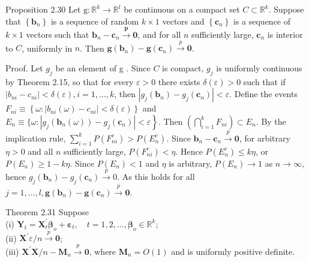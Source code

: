 \documentclass[10pt]{article}
\begin{document}
Proposition 2.30 Let $\mathrm{g}: \mathbb{R}^{k} \rightarrow \mathbb{R}^{l}$ be continuous on a compact set $C \subset \mathbb{R}^{k}$. Suppose that $\left\{\mathbf{b}_{n}\right\}$ is a sequence of random $k \times 1$ vectors and $\left\{\mathbf{c}_{n}\right\}$ is a sequence of $k \times 1$ vectors such that $\mathbf{b}_{n}-\mathbf{c}_{n} \xrightarrow{\boldsymbol{p}} \mathbf{0}$, and for all $n$ sufficiently large, $\mathbf{c}_{n}$ is interior to $C$, uniformly in $n$. Then $\mathbf{g}\left(\mathbf{b}_{n}\right)-\mathbf{g}\left(\mathbf{c}_{n}\right) \xrightarrow{p} \mathbf{0}$.

Proof. Let $g_{j}$ be an element of g . Since $C$ is compact, $g_{j}$ is uniformly continuous by Theorem 2.15, so that for every $\varepsilon>0$ there exists $\delta(\varepsilon)>0$ such that if $\left|b_{n i}-c_{n i}\right|<\delta(\varepsilon), i=1, \ldots, k$, then $\left|g_{j}\left(\mathbf{b}_{n}\right)-g_{j}\left(\mathbf{c}_{n}\right)\right|< \varepsilon$. Define the events $F_{n i} \equiv\left\{\omega:\left|b_{n i}(\omega)-c_{n i}\right|<\delta(\varepsilon)\right\}$ and $E_{n} \equiv\{\omega: \left.\left|g_{j}\left(\mathbf{b}_{n}(\omega)\right)-g_{j}\left(\mathbf{c}_{n}\right)\right|<\varepsilon\right\}$. Then $\left(\bigcap_{i=1}^{k} F_{n i}\right) \subset E_{n}$. By the implication rule, $\sum_{i=1}^{k} P\left(F_{n i}^{c}\right)>P\left(E_{n}^{c}\right)$. Since $\mathbf{b}_{n}-\mathbf{c}_{n} \xrightarrow{p} \mathbf{0}$, for arbitrary $\eta>0$ and all $n$ sufficiently large, $P\left(F_{n i}^{c}\right)<\eta$. Hence $P\left(E_{n}^{c}\right) \leq k \eta$, or $P\left(E_{n}\right) \geq 1-k \eta$. Since $P\left(E_{n}\right)<1$ and $\eta$ is arbitrary, $P\left(E_{n}\right) \rightarrow 1$ as $n \rightarrow \infty$, hence $g_{j}\left(\mathbf{b}_{n}\right)-g_{j}\left(\mathbf{c}_{n}\right) \xrightarrow{p} 0$. As this holds for all $j=1, \ldots, l, \mathbf{g}\left(\mathbf{b}_{n}\right)-\mathbf{g}\left(\mathbf{c}_{n}\right) \xrightarrow{p} \mathbf{0}$.

Theorem 2.31 Suppose\\
(i) $\mathbf{Y}_{t}=\mathbf{X}_{t}^{\prime} \boldsymbol{\beta}_{o}+\boldsymbol{\varepsilon}_{t}, \quad t=1,2, \ldots, \boldsymbol{\beta}_{o} \in \mathbb{R}^{k} ;$\\
(ii) $\mathbf{X}^{\prime} \varepsilon / n \xrightarrow{p} \mathbf{0}$;\\
(iii) $\mathbf{X}^{\prime} \mathbf{X} / n-\mathbf{M}_{n} \xrightarrow{p} \mathbf{0}$, where $\mathbf{M}_{n}=O(1)$ and is uniformly positive definite.
\end{document}
